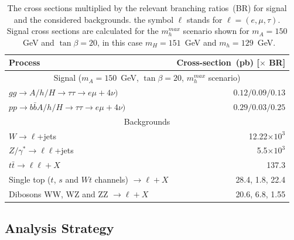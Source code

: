 \begin{table}[tp]
\begin{center}
\begin{small}
\begin{tabular}{lr}
\hline \hline
Process                                                                 & Cross-section~(pb) [$\times$ BR] \\ [1pt]
\hline
\multicolumn{2}{c}{Signal ($m_A=150$~GeV, $\tan\beta=20$, $m_{h}^{max}$ scenario) }  \\ [1pt]

$gg\rightarrow A/h/H \rightarrow\tau\tau \rightarrow e\mu+ 4\nu)$                 &  $0.12 / 0.09 / 0.13$ \\
$pp \rightarrow b\bar{b}A/h/H \rightarrow \tau\tau \rightarrow e\mu + 4\nu)$       & $ 0.29 /0.03 / 0.25   $ \\[1pt]
\hline
\multicolumn{2}{c}{Backgrounds} \\[1pt]
$W\rightarrow \ell$+jets                           & 12.22$\times 10^3$ \\
$Z/\gamma^{*}\rightarrow \ell\ell$+jets       & 5.5$\times 10^3$ \\
$t\bar{t} \rightarrow \ell \ell + X$                                                              & 137.3 \\
Single top ($t$, $s$ and $Wt$ channels) $\rightarrow \ell + X$               & 28.4, 1.8, 22.4 \\
Dibosons WW, WZ and ZZ  $\rightarrow \ell + X$                                          & 20.6, 6.8, 1.55 \\ [1pt]
\hline 
\hline
\end{tabular}
\end{small}
\caption{The cross sections multiplied by the relevant branching ratios~(BR) for signal and the considered
backgrounds. the symbol $\ell$ stands for $\ell= (e, \mu, \tau)$. 
Signal cross sections are calculated for the $m_{h}^{max}$ scenario shown for
 $m_A=150$~GeV and $\tan\beta=20$, in this case  $m_H=151$~GeV and $m_h=129$~GeV.}
 \label{tab:MCxsec}

\end{center}
\end{table}


\subsection{Analysis Strategy} \label{sec:strategy}


